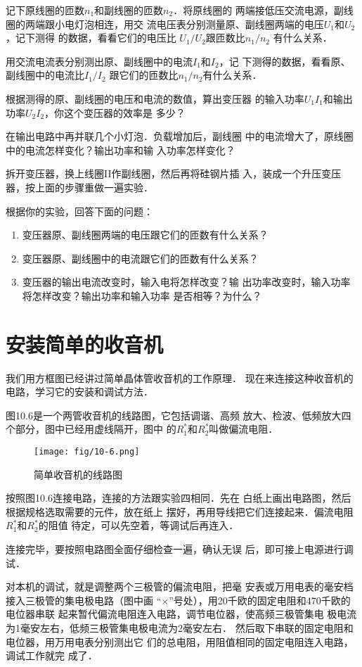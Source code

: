 记下原线圈的匝数$n_1$和副线圈的匝数$n_2$．将原线圈的
两端接低压交流电源，副线圈的两端跟小电灯泡相连，用交
流电压表分别测量原、副线圈两端的电压$U_1$和$U_2$，记下测得
的数据，看看它们的电压比
$U_1/U_2$跟匝数比$n_1/n_2$
有什么关系．

用交流电流表分别测出原、副线圈中的电流$I_1$和$I_2$，记
下测得的数据，看看原、副线圈中的电流比$I_1/I_2$
跟它们的匝数比$n_1/n_2$有什么关系．

根据测得的原、副线圈的电压和电流的数值，算出变压器
的输入功率$U_1I_1$和输出功率$U_2I_2$，你这个变压器的效率是
多少？

在输出电路中再并联几个小灯泡．负载增加后，副线圈
中的电流增大了，原线圈中的电流怎样变化？输出功率和输
入功率怎样变化？

拆开变压器，换上线圈II作副线圈，然后再将硅钢片插
入，装成一个升压变压器，按上面的步骤重做一遍实验．

根据你的实验，回答下面的问题：
\begin{enumerate}
    \item 变压器原、副线圈两端的电压跟它们的匝数有什么关系？
    \item 变压器原、副线圈中的电流跟它们的匝数有什么关系？
    \item 变压器的输出电流改变时，输入电将怎样改变？输
出功率改变时，输入功率将怎样改变？输出功率和输入功率
是否相等？为什么？
\end{enumerate}

\section{安装简单的收音机}
我们用方框图已经讲过简单晶体管收音机的工作原理．
现在来连接这种收音机的电路，学习它的安装和调试方法．

图10.6是一个两管收音机的线路图，它包括调谐、高频
放大、检波、低频放大四个部分，图中已经用虚线隔开，图中
的$R_1^*$和$R_2^*$叫做偏流电阻．
\begin{figure}[htp]\centering
    \texttt{[image: fig/10-6.png]}
    \caption{简单收音机的线路图}
    \end{figure}

按照图10.6连接电路，连接的方法跟实验四相同．先在
白纸上画出电路图，然后根据规格选取需要的元件，放在纸上
摆好，再用导线把它们连接起来．偏流电阻$R_1^*$和$R_2^*$的阻值
待定，可以先空着，等调试后再连入．

连接完毕，要按照电路图全面仔细检查一遍，确认无误
后，即可接上电源进行调试．

对本机的调试，就是调整两个三极管的偏流电阻，把毫
安表或万用电表的毫安档接入三极管的集电极电路（图中画
“$\times$”号处），用20千欧的固定电阻和470千欧的电位器串联
起来暂代偏流电阻连入电路，调节电位器，使高频三极管集电
极电流为1毫安左右，低频三极管集电极电流为2毫安左右．
然后取下串联的固定电阻和电位器，用万用电表分别测出它
们的总电阻，用阻值相同的固定电阻连入电路，调试工作就完
成了．

